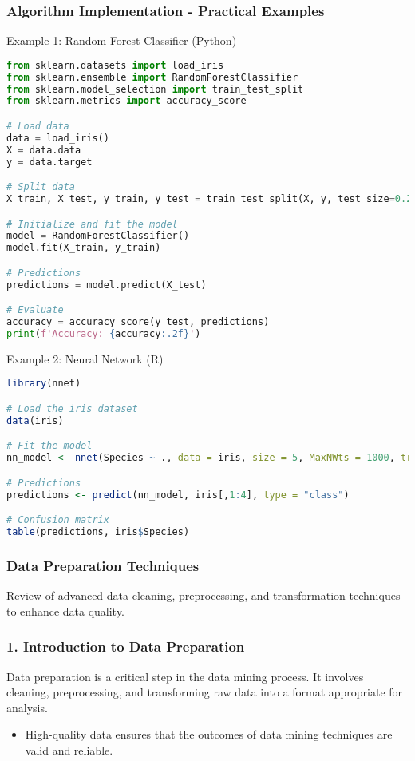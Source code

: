 \documentclass{beamer}
\begin{document}
\begin{frame}[fragile]
    \frametitle{Algorithm Implementation - Practical Examples}
    \begin{block}{Example 1: Random Forest Classifier (Python)}
    \begin{lstlisting}[language=Python]
from sklearn.datasets import load_iris
from sklearn.ensemble import RandomForestClassifier
from sklearn.model_selection import train_test_split
from sklearn.metrics import accuracy_score

# Load data
data = load_iris()
X = data.data
y = data.target

# Split data
X_train, X_test, y_train, y_test = train_test_split(X, y, test_size=0.2, random_state=42)

# Initialize and fit the model
model = RandomForestClassifier()
model.fit(X_train, y_train)

# Predictions
predictions = model.predict(X_test)

# Evaluate
accuracy = accuracy_score(y_test, predictions)
print(f'Accuracy: {accuracy:.2f}')
    \end{lstlisting}
    \end{block}

    \begin{block}{Example 2: Neural Network (R)}
    \begin{lstlisting}[language=R]
library(nnet)

# Load the iris dataset
data(iris)

# Fit the model
nn_model <- nnet(Species ~ ., data = iris, size = 5, MaxNWts = 1000, trace = FALSE)

# Predictions
predictions <- predict(nn_model, iris[,1:4], type = "class")

# Confusion matrix
table(predictions, iris$Species)
    \end{lstlisting}
    \end{block}
\end{frame}

\begin{frame}
    \frametitle{Data Preparation Techniques}
    Review of advanced data cleaning, preprocessing, and transformation techniques to enhance data quality.
\end{frame}

\begin{frame}
    \frametitle{1. Introduction to Data Preparation}
    Data preparation is a critical step in the data mining process. It involves cleaning, preprocessing, and transforming raw data into a format appropriate for analysis. 
    \begin{itemize}
        \item High-quality data ensures that the outcomes of data mining techniques are valid and reliable.
    \end{itemize}
\end{frame}
\end{document}
